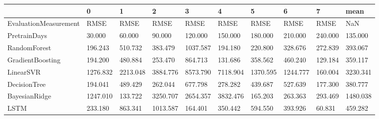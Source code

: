 \begin{tabular}{llllllllll}
\toprule
{} &        0 &        1 &        2 &        3 &        4 &        5 &        6 &       7 &     mean \\
\midrule
EvaluationMeasurement &     RMSE &     RMSE &     RMSE &     RMSE &     RMSE &     RMSE &     RMSE &    RMSE &      NaN \\
PretrainDays          &   30.000 &   60.000 &   90.000 &  120.000 &  150.000 &  180.000 &  210.000 & 240.000 &  135.000 \\
RandomForest          &  196.243 &  510.732 &  383.479 & 1037.587 &  194.180 &  220.800 &  328.676 & 272.839 &  393.067 \\
GradientBoosting      &  194.200 &  480.884 &  253.470 &  864.713 &  131.686 &  358.562 &  460.240 & 129.184 &  359.117 \\
LinearSVR             & 1276.832 & 2213.048 & 3884.776 & 8573.790 & 7118.904 & 1370.595 & 1244.777 & 160.004 & 3230.341 \\
DecisionTree          &  194.041 &  489.429 &  262.044 &  677.798 &  278.282 &  439.687 &  527.639 & 177.300 &  380.777 \\
BayesianRidge         & 1247.010 &  133.722 & 3250.707 & 2654.357 & 3832.476 &  165.203 &  263.363 & 293.469 & 1480.038 \\
LSTM                  &  233.180 &  863.341 & 1013.587 &  164.401 &  350.442 &  594.550 &  393.926 &  60.831 &  459.282 \\
\bottomrule
\end{tabular}
